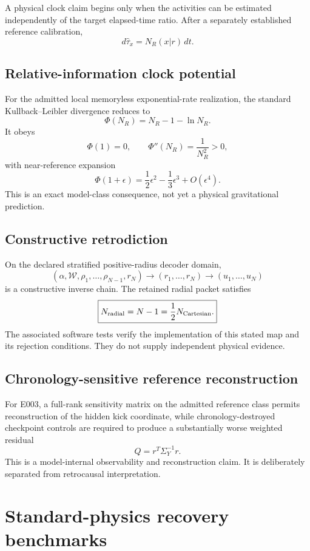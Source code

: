 A physical clock claim begins only when the activities can be estimated independently of the target elapsed-time ratio. After a separately established reference calibration,
\[
d\widehat\tau_x=N_R(x|r)\,dt.
\]

\subsection{Relative-information clock potential}

For the admitted local memoryless exponential-rate realization, the standard Kullback--Leibler divergence \cite{KullbackLeibler1951} reduces to
\[
\boxed{
\Phi(N_R)=N_R-1-\ln N_R.
}
\]
It obeys
\[
\Phi(1)=0,
\qquad
\Phi''(N_R)=\frac{1}{N_R^2}>0,
\]
with near-reference expansion
\[
\Phi(1+\epsilon)=\frac12\epsilon^2-\frac13\epsilon^3+O(\epsilon^4).
\]
This is an exact model-class consequence, not yet a physical gravitational prediction.

\subsection{Constructive retrodiction}

On the declared stratified positive-radius decoder domain,
\[
(\alpha,\mathcal W,\rho_1,\ldots,\rho_{N-1},r_N)
\longrightarrow
(r_1,\ldots,r_N)
\longrightarrow
(u_1,\ldots,u_N)
\]
is a constructive inverse chain. The retained radial packet satisfies
\[
\boxed{
N_{\rm radial}=N-1
=\frac12N_{\rm Cartesian}.
}
\]
The associated software tests verify the implementation of this stated map and its rejection conditions. They do not supply independent physical evidence.

\subsection{Chronology-sensitive reference reconstruction}

For E003, a full-rank sensitivity matrix on the admitted reference class permits reconstruction of the hidden kick coordinate, while chronology-destroyed checkpoint controls are required to produce a substantially worse weighted residual
\[
Q=r^T\Sigma_Y^{-1}r.
\]
This is a model-internal observability and reconstruction claim. It is deliberately separated from retrocausal interpretation.

\section{Standard-physics recovery benchmarks}


